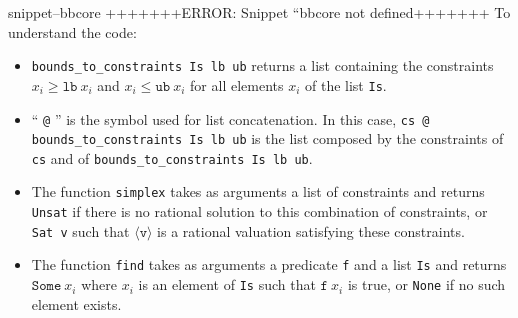 \documentclass{article}
\newcommand{\Snippet}[1]{%
  \ifcsname snippet--#1\endcsname{\csname snippet--#1\endcsname}%
  \else+++++++ERROR: Snippet ``#1 not defined+++++++ \fi}
\begin{document}
\Snippet{bbcore}
To understand the code:
\begin{itemize}
  \item \texttt{bounds\_to\_constraints Is lb ub} returns a list containing the
    constraints $x_i \geqslant \mathtt{lb}~x_i$ and
    $x_i \leqslant \mathtt{ub}~x_i$ for all elements $x_i$ of the list
    \texttt{Is}.
  \item `` \texttt{@} '' is the symbol used for list concatenation. In this case,
    \linebreak \texttt{cs @ bounds\_to\_constraints Is lb ub} is the list
    composed by the constraints of \texttt{cs} and of
    \texttt{bounds\_to\_constraints~Is~lb~ub}.
  \item The function \texttt{simplex} takes as arguments a list of
    constraints and returns \texttt{Unsat} if there is no rational solution to
    this combination of constraints, or \texttt{Sat v} such that
    $\langle \mathtt{v} \rangle$ is a rational valuation satisfying these
    constraints.
  \item The function \texttt{find} takes as arguments a predicate \texttt{f}
    and a list \texttt{Is} and returns $\mathtt{Some}~x_i$ where $x_i$ is
    an element of \texttt{Is} such that $\mathtt{f}~x_i$ is true, or
    \texttt{None} if no such element exists.
\end{itemize}
\end{document}
